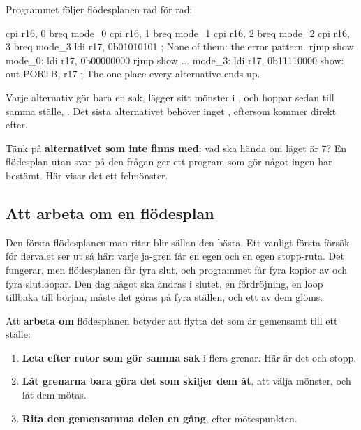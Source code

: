 
Programmet  följer flödesplanen rad för rad:

\begin{asmcode}
    cpi r16, 0
    breq mode_0
    cpi r16, 1
    breq mode_1
    cpi r16, 2
    breq mode_2
    cpi r16, 3
    breq mode_3
    ldi r17, 0b01010101             ; None of them: the error pattern.
    rjmp show
mode_0:
    ldi r17, 0b00000000
    rjmp show
    ...
mode_3:
    ldi r17, 0b11110000
show:
    out PORTB, r17                  ; The one place every alternative ends up.
\end{asmcode}

\noindent Varje alternativ gör bara en sak, lägger sitt mönster i , och hoppar sedan till
samma ställe, . Det sista alternativet behöver inget , eftersom
 kommer direkt efter.

Tänk på \textbf{alternativet som inte finns med}: vad ska hända om läget är 7? En flödesplan utan
svar på den frågan ger ett program som gör något ingen har bestämt. Här visar det ett felmönster.

\subsection{Att arbeta om en flödesplan}
\label{c9:a8}
Den första flödesplanen man ritar blir sällan den bästa. Ett vanligt första försök för flervalet
ser ut så här: varje ja-gren får en egen  och en egen stopp-ruta. Det
fungerar, men flödesplanen får fyra slut, och programmet får fyra kopior av  och fyra
slutloopar. Den dag något ska ändras i slutet, en fördröjning, en loop tillbaka till början, måste
det göras på fyra ställen, och ett av dem glöms.

Att \textbf{arbeta om} flödesplanen betyder att flytta det som är gemensamt till ett ställe:
\begin{enumerate}
  \item \textbf{Leta efter rutor som gör samma sak} i flera grenar. Här är det
     och stopp.
  \item \textbf{Låt grenarna bara göra det som skiljer dem åt}, att välja mönster, och låt dem
    mötas.
  \item \textbf{Rita den gemensamma delen en gång}, efter mötespunkten.
\end{enumerate}

